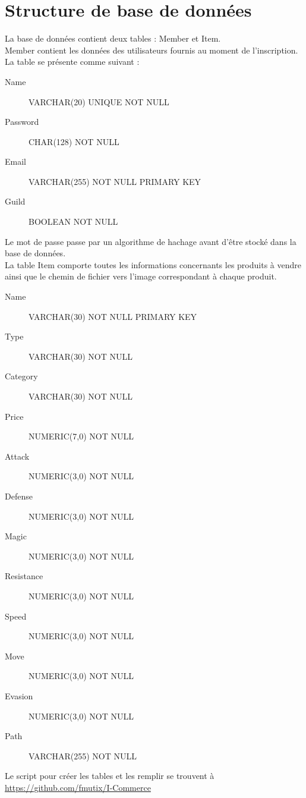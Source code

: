 \section{Structure de base de données}

La base de données contient deux tables : Member et Item. \\

Member contient les données des utilisateurs fournis au moment de l'inscription. 
La table se présente comme suivant :

\begin{description}
	\item[Name] VARCHAR(20) UNIQUE NOT NULL
	\item[Password] CHAR(128) NOT NULL
	\item[Email] VARCHAR(255) NOT NULL PRIMARY KEY
	\item[Guild] BOOLEAN NOT NULL
\end{description}

Le mot de passe passe par un algorithme de hachage avant d'être stocké dans 
la base de données. \\

La table Item comporte toutes les informations concernants les produits à 
vendre ainsi que le chemin de fichier vers l'image correspondant à chaque 
produit.

\begin{description}
	\item[Name] VARCHAR(30) NOT NULL PRIMARY KEY
	\item[Type] VARCHAR(30) NOT NULL
	\item[Category] VARCHAR(30) NOT NULL
	\item[Price] NUMERIC(7,0) NOT NULL
	\item[Attack] NUMERIC(3,0) NOT NULL
	\item[Defense] NUMERIC(3,0) NOT NULL
	\item[Magic] NUMERIC(3,0) NOT NULL
	\item[Resistance] NUMERIC(3,0) NOT NULL
	\item[Speed] NUMERIC(3,0) NOT NULL
	\item[Move] NUMERIC(3,0) NOT NULL
	\item[Evasion] NUMERIC(3,0) NOT NULL
	\item[Path] VARCHAR(255) NOT NULL
\end{description}

Le script pour créer les tables et les remplir se trouvent à 
\href{https://github.com/fmutix/I-Commerce/tree/master/script}
{https://github.com/fmutix/I-Commerce}
